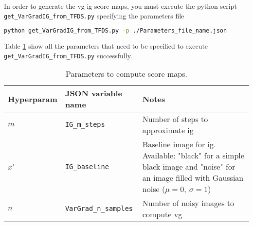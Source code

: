 
\glsresetall

In order to generate the \acrlong{vg} \acrlong{ig} score maps, you must execute the python script \texttt{get\_VarGradIG\_from\_TFDS.py} specifying the parameters file
\begin{lstlisting}[language=Bash]
python get_VarGradIG_from_TFDS.py -p ./Parameters_file_name.json
\end{lstlisting}

Table \ref{table:imp_notes:VGIG_params} show all the parameters that need to be specified to execute \\
\noindent \texttt{get\_VarGradIG\_from\_TFDS.py} successfully.

\setlength{\mylinewidth}{\linewidth-7pt}%
\setlength{\mylengtha}{0.18\mylinewidth-2\arraycolsep}%
\setlength{\mylengthb}{0.27\mylinewidth-2\arraycolsep}%
\setlength{\mylengthc}{0.55\mylinewidth-2\arraycolsep}%

\begin{table}[!ht]
  \centering
  \begin{tabular}{>{\centering\arraybackslash}m{\mylengtha}|>{\centering\arraybackslash}m{\mylengthb}|m{\mylengthc}} %
    \hline
    Hyperparam & JSON variable name & Notes \\
    \hline
    $m$ & \texttt{IG\_m\_steps} & Number of steps to approximate \gls{ig} \\
    \hline
    $x'$ &  \texttt{IG\_baseline} & Baseline image for \gls{ig}. Available: "black" for a simple black image and "noise" for an image filled with Gaussian noise ($\mu=0,\ \sigma=1$) \\
    \hline
    $n$ & \texttt{VarGrad\_n\_samples} & Number of noisy images to compute \gls{vg} \\
    \hline
  \end{tabular}
  \caption{Parameters to compute score maps.}
  \label{table:imp_notes:VGIG_params}
\end{table}
